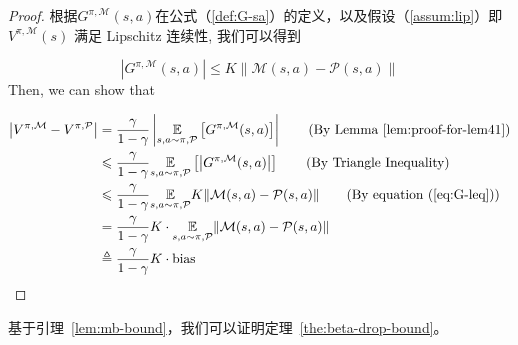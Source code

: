 \begin{proof}

根据$G^{\pi,\mathcal{M}}(s,a)$在公式（\ref{def:G-sa}）的定义，以及假设（\ref{assum:lip}）即 ${V}^{\pi,\mathcal{M}}(s)$ 满足 Lipschitz 连续性, 我们可以得到

\begin{equation}\label{eq:G-leq}
|G^{\pi,\mathcal{M}}(s,a)|\leq K\|\mathcal{M}(s,a)-\mathcal{P}(s,a)\|
\end{equation}
Then, we can show that

\begin{align*}
\left|{V}^{\pi, \mathcal{M}}-{V}^{\pi, \mathcal{P}}\right| &= \frac{\gamma}{1-\gamma}\left|\underset{s,a\sim\pi,\mathcal{P}}{\mathbb{E}}\left[G^{\pi,\mathcal{M}}(s,a)\right]\right| \tag{By Lemma \ref{lem:proof-for-lem41}}\\
&\leq \frac{\gamma}{1-\gamma}\underset{s,a\sim\pi,\mathcal{P}}{\mathbb{E}}\left[\left|G^{\pi,\mathcal{M}}(s,a)\right|\right] \tag{By Triangle Inequality}\\
&\leq \frac{\gamma}{1-\gamma}\underset{s,a\sim\pi,\mathcal{P}}{\mathbb{E}}K\|\mathcal{M}(s,a)-\mathcal{P}(s,a)\| \tag{By equation (\ref{eq:G-leq})}\\
&= \frac{\gamma}{1-\gamma}K\cdot\underset{s,a\sim\pi,\mathcal{P}}{\mathbb{E}}\|\mathcal{M}(s,a)-\mathcal{P}(s,a)\|\\
&\triangleq \frac{\gamma}{1-\gamma}K\cdot\mathrm{bias}
\end{align*}

\end{proof}

基于引理~\ref{lem:mb-bound}，我们可以证明定理~\ref{the:beta-drop-bound}。








